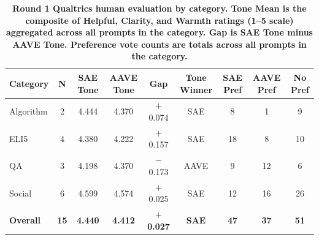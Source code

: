 \begin{table}[htbp]
\centering
\caption{\textbf{Round 1 Qualtrics human evaluation by category. Tone Mean is the composite of Helpful, Clarity, and Warmth ratings (1--5 scale) aggregated across all prompts in the category. Gap is SAE Tone minus AAVE Tone. Preference vote counts are totals across all prompts in the category.}}
\label{tab:round1-qualtrics-tone-by-category}
\renewcommand{\arraystretch}{1.4}
\begin{tabular}{|l|c|c|c|c|c|c|c|c|}
\hline
\textbf{Category} & \textbf{N} & \textbf{SAE Tone} & \textbf{AAVE Tone} & \textbf{Gap} & \textbf{Tone Winner} & \textbf{SAE Pref} & \textbf{AAVE Pref} & \textbf{No Pref} \\
\hline
Algorithm & 2 & 4.444 & 4.370 & $+$0.074 & SAE  &  8 &  1 &  9 \\
\hline
ELI5      & 4 & 4.380 & 4.222 & $+$0.157 & SAE  & 18 &  8 & 10 \\
\hline
QA        & 3 & 4.198 & 4.370 & $-$0.173 & AAVE &  9 & 12 &  6 \\
\hline
Social    & 6 & 4.599 & 4.574 & $+$0.025 & SAE  & 12 & 16 & 26 \\
\hline\hline
\textbf{Overall} & \textbf{15} & \textbf{4.440} & \textbf{4.412} & $+$\textbf{0.027} & \textbf{SAE} & \textbf{47} & \textbf{37} & \textbf{51} \\
\hline
\end{tabular}
\end{table}
